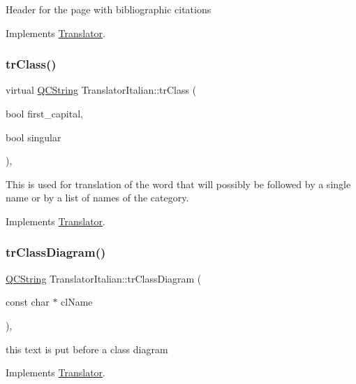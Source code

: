 Header for the page with bibliographic citations 

Implements \mbox{\hyperlink{class_translator}{Translator}}.

\mbox{\label{class_translator_italian_a43814783b774642e4f9aa38592e00ffd}} 
\subsubsection{\texorpdfstring{trClass()}{trClass()}}
{\footnotesize\ttfamily virtual \mbox{\hyperlink{class_q_c_string}{Q\+C\+String}} Translator\+Italian\+::tr\+Class (\begin{DoxyParamCaption}\item[{bool}]{first\+\_\+capital,  }\item[{bool}]{singular }\end{DoxyParamCaption})\hspace{0.3cm}{\ttfamily [inline]}, {\ttfamily [virtual]}}

This is used for translation of the word that will possibly be followed by a single name or by a list of names of the category. 

Implements \mbox{\hyperlink{class_translator}{Translator}}.

\mbox{\label{class_translator_italian_af92767bf648ef6c5776a551dcca0b411}} 
\subsubsection{\texorpdfstring{trClassDiagram()}{trClassDiagram()}}
{\footnotesize\ttfamily \mbox{\hyperlink{class_q_c_string}{Q\+C\+String}} Translator\+Italian\+::tr\+Class\+Diagram (\begin{DoxyParamCaption}\item[{const char $\ast$}]{cl\+Name }\end{DoxyParamCaption})\hspace{0.3cm}{\ttfamily [inline]}, {\ttfamily [virtual]}}

this text is put before a class diagram 

Implements \mbox{\hyperlink{class_translator}{Translator}}.

